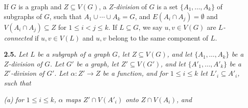 If $G$ is a graph and $Z \subseteq V(G)$, a \textit{$Z$-division} of $G$ is a set $\{A_1, \ldots, A_k\}$ of subgraphs of $G$, such that $A_1 \cup \cdots \cup A_k = G$, and $E(A_i \cap A_j) = \emptyset$ and $V(A_i \cap A_j) \subseteq Z$ for $1 \le i < j \le k$. If $L \subseteq G$, we say $u, v \in V(G)$ are \textit{$L$-connected} if $u, v \in V(L)$ and $u, v$ belong to the same component of $L$.

\textbf{2.5.} \textit{Let $L$ be a subgraph of a graph $G$, let $Z \subseteq V(G)$, and let $\{A_1, \ldots, A_k\}$ be a $Z$-division of $G$. Let $G'$ be a graph, let $Z' \subseteq V(G')$, and let $\{A'_1, \ldots, A'_k\}$ be a $Z'$-division of $G'$. Let $\alpha : Z' \to Z$ be a function, and for $1 \le i \le k$ let $L'_i \subseteq A'_i$, such that}

\textit{(a) for $1 \le i \le k$, $\alpha$ maps $Z' \cap V(A'_i)$ onto $Z \cap V(A_i)$, and}
